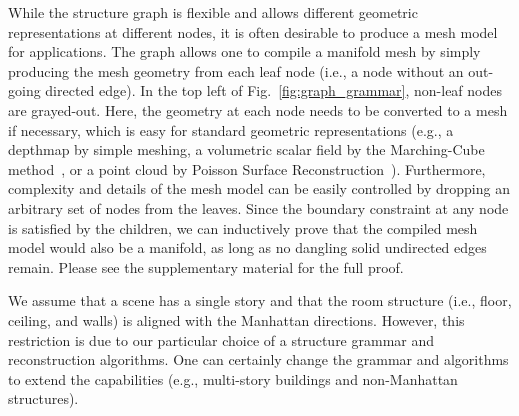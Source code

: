  While the structure graph is flexible
and allows different geometric representations at different nodes, it is
often desirable to produce a mesh model for applications.
The graph allows one to compile a manifold mesh by simply producing the
mesh geometry from each leaf node (i.e., a node without an out-going
directed edge). In the top left of Fig.~\ref{fig:graph_grammar},
non-leaf nodes are grayed-out. Here, the geometry at each node needs to
be converted to a mesh if necessary, which is easy for standard
geometric representations (e.g., a depthmap by simple meshing, a
volumetric scalar field by the Marching-Cube method~\cite{MarchingCube},
or a point cloud by Poisson Surface
Reconstruction~\cite{shan2014occluding}). Furthermore,
complexity and details of the mesh model can be easily controlled by dropping an arbitrary set of nodes from the
leaves. Since the boundary constraint at any node is satisfied by the
children, we can inductively prove that the compiled mesh model would
also be a manifold, as long as no dangling solid undirected edges
remain. Please see the supplementary material for the full proof.


 We assume that a scene has a single story
and that the room structure (i.e., floor, ceiling, and walls) is aligned
with the Manhattan directions. However, this restriction is due to our
particular choice of a structure grammar and reconstruction
algorithms. One can certainly change the grammar and algorithms to
extend the capabilities (e.g., multi-story buildings and non-Manhattan
structures).
%



